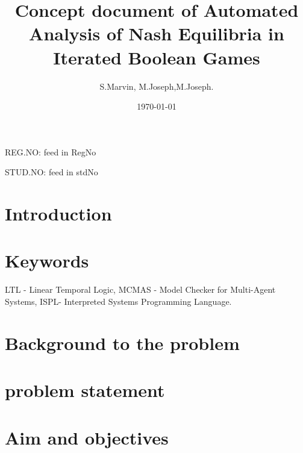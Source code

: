 \documentclass[14pt]{article}
\begin{document}
		\begin{flushleft} \begin{huge} REG.NO: feed in RegNo   \end{huge} \end{flushleft}

		\begin{flushleft} \begin{huge} STUD.NO: feed in stdNo    \end{huge} \end{flushleft}

		
		
		
		\title{Concept document of Automated Analysis of Nash Equilibria in Iterated Boolean Games }

		\author{S.Marvin, M.Joseph,M.Joseph.}

		\date {\today}

		\maketitle

		\tableofcontents

			\section{Introduction}

				

			\section{Keywords}
			
				LTL - Linear Temporal Logic, MCMAS - Model Checker for Multi-Agent Systems, ISPL- Interpreted Systems Programming Language.

				

			\section{Background to the problem}

				
			\section{problem statement}
			
			
			\section{Aim and objectives}
			
\end{document}
